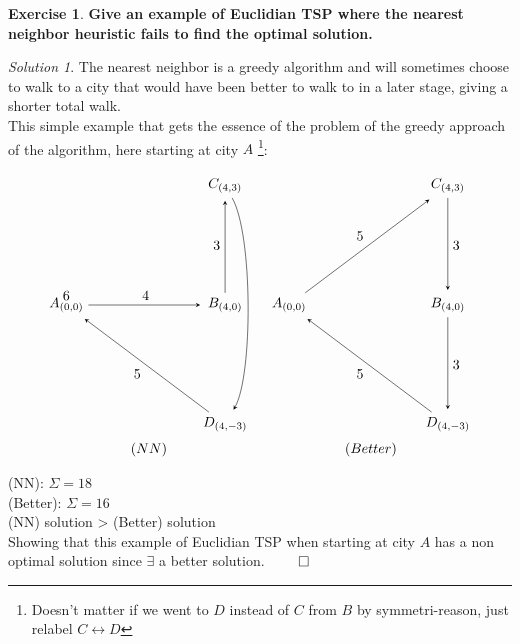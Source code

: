 \documentclass[a4paper,twoside=false,abstract=false,numbers=noenddot,
titlepage=false,headings=small,parskip=half,version=last]{scrartcl}
\theoremstyle{definition}
\newtheorem{exercise}{Exercise}
\theoremstyle{remark}
\newtheorem*{solution}{Solution}
\begin{document}
\begin{exercise}
{\bf
Give an example of Euclidian TSP where the nearest neighbor heuristic fails
to find the optimal solution.
}
\end{exercise}
\begin{solution}

The nearest neighbor is a greedy algorithm and will sometimes
choose to walk to a city that would have been better to walk
to in a later stage, giving a shorter total walk.
\\
This simple example that gets the essence of the problem
of the greedy approach of the algorithm, here starting at city $A$
\footnote{Doesn't matter if we went to $D$ instead of $C$ from $B$ by symmetri-reason, just relabel $C \leftrightarrow D$}: 

\[\begin{matrix}
    \begin{tikzpicture}[>=stealth,->,shorten >=2pt,looseness=.5,auto]
        \node at (0,0) (A) {$A_{(0,0)}$};
        \node at (4,0) (B) {$B_{(4,0)}$};
        \node at (4,3) (C) {$C_{(4,3)}$};
        \node at (4,-3) (D) {$D_{(4,-3)}$};

        \draw (A) -- (B) node [midway] {4};
        \draw (B) -- (C) node [midway] {3};
        \draw (C) to[bend left] (D) node [midway] {6}; 
        \draw (D) -- (A) node [midway] {5};
    \end{tikzpicture}
    &
    \begin{tikzpicture}[>=stealth,->,shorten >=2pt,looseness=.5,auto]
        \node at (0,0) (A) {$A_{(0,0)}$};
        \node at (4,0) (B) {$B_{(4,0)}$};
        \node at (4,3) (C) {$C_{(4,3)}$};
        \node at (4,-3) (D) {$D_{(4,-3)}$};

        \draw (A) -- (C) node [midway] {5};
        \draw (C) -- (B) node [midway] {3};
        \draw (B) -- (D) node [midway] {3}; 
        \draw (D) -- (A) node [midway] {5};
    \end{tikzpicture}
    \\
    (NN)
    &
    (Better)
    \\
\end{matrix}\]


(NN): $\Sigma=18$ \\
(Better): $\Sigma=16$ \\

(NN) solution > (Better) solution \\
Showing that this example of Euclidian TSP
when starting at city $A$ has a non optimal solution since $\exists$ a better solution. $\qed$

\end{solution}
\end{document}
